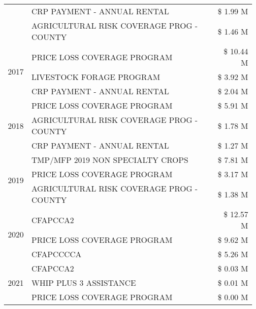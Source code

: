 \begin{tabular}{llr}
 & CRP PAYMENT - ANNUAL RENTAL & \$ 1.99 M \\
 & AGRICULTURAL RISK COVERAGE PROG - COUNTY & \$ 1.46 M \\
\cline{1-3}
\multirow[t]{3}{*}{2017} & PRICE LOSS COVERAGE PROGRAM & \$ 10.44 M \\
 & LIVESTOCK FORAGE PROGRAM & \$ 3.92 M \\
 & CRP PAYMENT - ANNUAL RENTAL & \$ 2.04 M \\
\cline{1-3}
\multirow[t]{3}{*}{2018} & PRICE LOSS COVERAGE PROGRAM & \$ 5.91 M \\
 & AGRICULTURAL RISK COVERAGE PROG - COUNTY & \$ 1.78 M \\
 & CRP PAYMENT - ANNUAL RENTAL & \$ 1.27 M \\
\cline{1-3}
\multirow[t]{3}{*}{2019} & TMP/MFP 2019 NON SPECIALTY CROPS & \$ 7.81 M \\
 & PRICE LOSS COVERAGE PROGRAM & \$ 3.17 M \\
 & AGRICULTURAL RISK COVERAGE PROG - COUNTY & \$ 1.38 M \\
\cline{1-3}
\multirow[t]{3}{*}{2020} & CFAPCCA2 & \$ 12.57 M \\
 & PRICE LOSS COVERAGE PROGRAM & \$ 9.62 M \\
 & CFAPCCCCA & \$ 5.26 M \\
\cline{1-3}
\multirow[t]{3}{*}{2021} & CFAPCCA2 & \$ 0.03 M \\
 & WHIP PLUS 3 ASSISTANCE & \$ 0.01 M \\
 & PRICE LOSS COVERAGE PROGRAM & \$ 0.00 M \\
\cline{1-3}
\bottomrule
\end{tabular}
